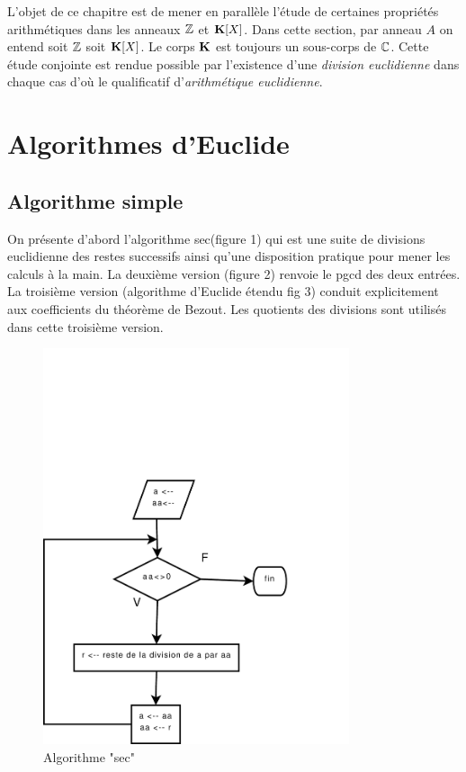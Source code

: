 



L'objet de ce chapitre est de mener en parallèle l'étude de certaines propriétés arithmétiques dans les anneaux $\mathbb{Z}$ et $\mathbf{K}[X]$. Dans cette section, par anneau $A$ on entend soit $\mathbb{Z}$ soit $\mathbf{K}[X]$. Le corps $\mathbf{K}$ est toujours un sous-corps de $\mathbb{C}$. Cette étude conjointe est rendue possible par l'existence d'une \emph{division euclidienne} dans chaque cas d'où le qualificatif d'\emph{arithmétique euclidienne}.

\section{Algorithmes d'Euclide}
\subsection{Algorithme simple}
On présente d'abord l'algorithme \og sec\fg (figure 1) qui est une suite de divisions euclidienne des restes successifs ainsi qu'une disposition pratique pour mener les calculs \og à la main\fg. La deuxième version (figure 2) renvoie le pgcd des deux entrées. La troisième version (algorithme d'Euclide étendu fig 3) conduit explicitement aux coefficients du théorème de Bezout. Les quotients des divisions sont utilisés dans cette troisième version.
\begin{figure}[ht]
 \centering
 \includegraphics[width=9cm]{C5546_1.pdf}
 \caption{Algorithme "sec"}
 \label{C5546_1}
\end{figure}

